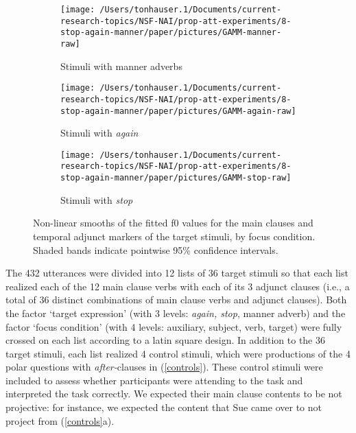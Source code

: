 \documentclass[a4paper,12pt]{article}
\newcommand{\6}{\mbox{$[\hspace*{-.6mm}[$}}
\newcommand{\9}{\mbox{$]\hspace*{-.6mm}]$}}
\begin{document}
\begin{figure}[h!]

\begin{subfigure}{.4\textwidth}
\centering
\texttt{[image: /Users/tonhauser.1/Documents/current-research-topics/NSF-NAI/prop-att-experiments/8-stop-again-manner/paper/pictures/GAMM-manner-raw]}
\caption{Stimuli with manner adverbs}
\end{subfigure}\hspace*{1.5cm}
\begin{subfigure}{.4\textwidth}
\centering
\texttt{[image: /Users/tonhauser.1/Documents/current-research-topics/NSF-NAI/prop-att-experiments/8-stop-again-manner/paper/pictures/GAMM-again-raw]}
\caption{Stimuli with {\em again}}
\end{subfigure} 

\vspace*{-1cm}

\begin{subfigure}{1\textwidth}
\centering
\texttt{[image: /Users/tonhauser.1/Documents/current-research-topics/NSF-NAI/prop-att-experiments/8-stop-again-manner/paper/pictures/GAMM-stop-raw]}
\caption{Stimuli with {\em stop}}
\end{subfigure}

\caption{Non-linear smooths of the fitted f0 values for the main clauses and temporal adjunct markers of the target stimuli, by focus condition. Shaded bands indicate pointwise 95\% confidence intervals.}\label{f-gamm}
\end{figure}

The 432 utterances were divided into 12 lists of 36 target stimuli so that each list realized each of the 12 main clause verbs with each of its 3 adjunct clauses (i.e., a total of 36 distinct combinations of main clause verbs and adjunct clauses). Both the factor `target expression' (with 3 levels: {\em again, stop}, manner adverb) and the factor `focus condition' (with 4 levels: auxiliary, subject, verb, target) were fully crossed on each list according to a latin square design. In addition to the 36 target stimuli, each list realized 4 control stimuli, which were productions of the 4 polar questions with {\em after-}clauses in (\ref{controls}). These control stimuli were included to assess whether participants were attending to the task and interpreted the task correctly. We expected their main clause contents to be not projective: for instance, we expected the content that Sue came over to not project from (\ref{controls}a). 
\end{document}
